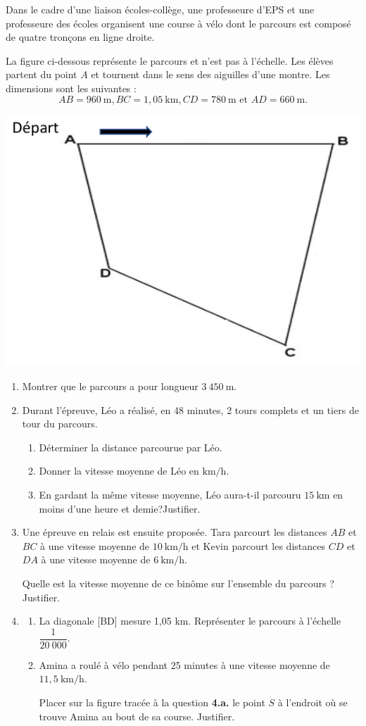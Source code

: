 Dans le cadre d'une liaison écoles-collège, une professeure d'EPS et une professeure des écoles organisent une course à vélo dont le parcours est composé de quatre tronçons en ligne droite.

La figure ci-dessous représente le parcours et n'est pas à l'échelle. Les élèves partent du point $A$ et tournent dans le sens des aiguilles d'une montre. Les dimensions sont les suivantes :
$$
AB=960~\text{m}, BC=1,05~\text{km}, CD=780~\text{m} \text{ et } AD=660~\text{m}.
$$

\begin{center}
	\includegraphics[width=.5\textwidth]{./images/2022-g2-ex2-img1.png}
\end{center}

\begin{enumerate}
  \item Montrer que le parcours a pour longueur $3~450~\text{m}$.

  \item Durant l'épreuve, Léo a réalisé, en 48 minutes, 2 tours complets et un tiers de tour du parcours.
	\begin{enumerate}
		\item Déterminer la distance parcourue par Léo.
		\item Donner la vitesse moyenne de Léo en $\text{km/h}$.
		\item En gardant la même vitesse moyenne, Léo aura-t-il parcouru $15~\text{km}$ en moins d'une heure et demie?Justifier.
	\end{enumerate}
  \item Une épreuve en relais est ensuite proposée. Tara parcourt les distances $AB$ et $BC$ à une vitesse moyenne de $10~\text{km/h}$ et Kevin parcourt les distances $CD$ et $DA$ à une vitesse moyenne de $6~\text{km/h}$.

Quelle est la vitesse moyenne de ce binôme sur l'ensemble du parcours ? Justifier.

  \item 
	\begin{enumerate}
	\item La diagonale [BD] mesure 1,05 km. Représenter le parcours à l'échelle $\dfrac{1}{20~000}$.
	\item Amina a roulé à vélo pendant 25 minutes à une vitesse moyenne de $11,5~\text{km/h}$.
	
	Placer sur la figure tracée à la question \textbf{4.a.} le point $S$ à l'endroit où se trouve Amina au bout de sa course. Justifier.
	\end{enumerate}
\end{enumerate}
